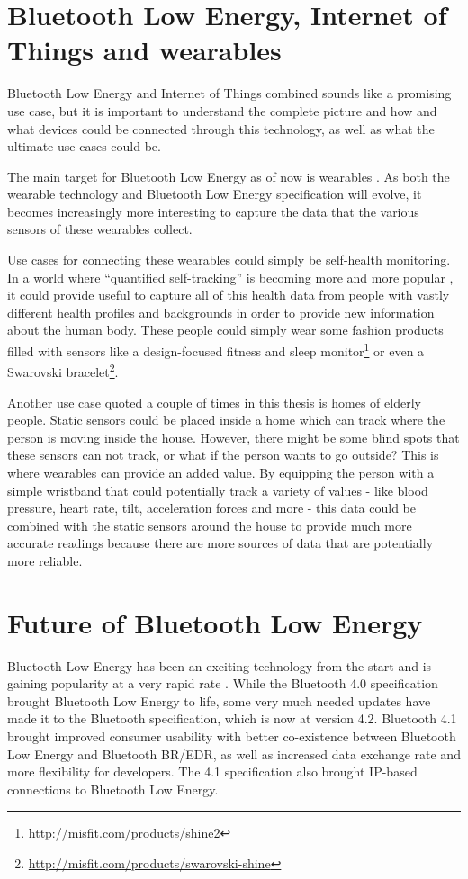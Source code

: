 \documentclass[pdftex,a4paper,12pt,twoside]{report}
\begin{document}
\section{Bluetooth Low Energy, Internet of Things and wearables}
\label{sec:bleiotwearables}
Bluetooth Low Energy and Internet of Things combined sounds like a promising use case, but it is important to understand the complete picture and how and what devices could be connected through this technology, as well as what the ultimate use cases could be.

The main target for Bluetooth Low Energy as of now is wearables \citep{blakesnow2016}. As both the wearable technology and Bluetooth Low Energy specification will evolve, it becomes increasingly more interesting to capture the data that the various sensors of these wearables collect.

Use cases for connecting these wearables could simply be self-health monitoring. In a world where ``quantified self-tracking'' is becoming more and more popular \citep{swan2012sensor}, it could provide useful to capture all of this health data from people with vastly different health profiles and backgrounds in order to provide new information about the human body. These people could simply wear some fashion products filled with sensors like a design-focused fitness and sleep monitor\footnote{\url{http://misfit.com/products/shine2}} or even a Swarovski bracelet\footnote{\url{http://misfit.com/products/swarovski-shine}}.

Another use case quoted a couple of times in this thesis is homes of elderly people. Static sensors could be placed inside a home which can track where the person is moving inside the house. However, there might be some blind spots that these sensors can not track, or what if the person wants to go outside? This is where wearables can provide an added value. By equipping the person with a simple wristband that could potentially track a variety of values - like blood pressure, heart rate, tilt, acceleration forces and more - this data could be combined with the static sensors around the house to provide much more accurate readings because there are more sources of data that are potentially more reliable.


\section{Future of Bluetooth Low Energy}
\label{sec:futureble}
Bluetooth Low Energy has been an exciting technology from the start and is gaining popularity at a very rapid rate \citep{bluetooth2016awareness}. While the Bluetooth 4.0 specification brought Bluetooth Low Energy to life, some very much needed updates have made it to the Bluetooth specification, which is now at version 4.2. Bluetooth 4.1 brought improved consumer usability with better co-existence between Bluetooth Low Energy and Bluetooth BR/EDR, as well as increased data exchange rate and more flexibility for developers. The 4.1 specification also brought IP-based connections to Bluetooth Low Energy.
\end{document}
